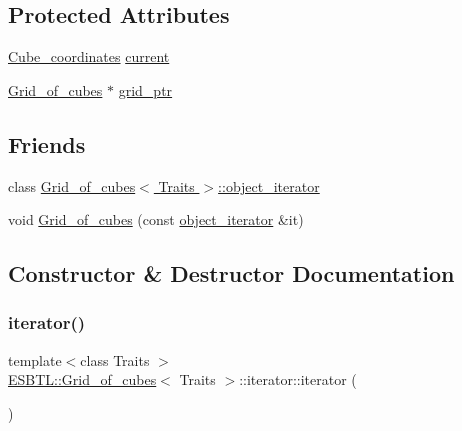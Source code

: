 \subsection*{Protected Attributes}
\begin{DoxyCompactItemize}
\item 
\hyperlink{structESBTL_1_1Grid__of__cubes_ad55c84346bab961e08d95e494551d07d}{Cube\+\_\+coordinates} \hyperlink{classESBTL_1_1Grid__of__cubes_1_1iterator_ab757f8b4d627babbf64ecc13a6de06f6}{current}
\item 
\hyperlink{structESBTL_1_1Grid__of__cubes}{Grid\+\_\+of\+\_\+cubes} $\ast$ \hyperlink{classESBTL_1_1Grid__of__cubes_1_1iterator_a492fb31fc0f9f1f7f61914a45bb7ed2e}{grid\+\_\+ptr}
\end{DoxyCompactItemize}
\subsection*{Friends}
\begin{DoxyCompactItemize}
\item 
class \hyperlink{classESBTL_1_1Grid__of__cubes_1_1iterator_a138d76a0aaa6fd7b0cbba3acb1474405}{Grid\+\_\+of\+\_\+cubes$<$ Traits $>$\+::object\+\_\+iterator}
\item 
void \hyperlink{classESBTL_1_1Grid__of__cubes_1_1iterator_a34522cc0511a0818c99ebcd4d1f010ec}{Grid\+\_\+of\+\_\+cubes} (const \hyperlink{classESBTL_1_1Grid__of__cubes_1_1object__iterator}{object\+\_\+iterator} \&it)
\end{DoxyCompactItemize}


\subsection{Constructor \& Destructor Documentation}
\mbox{\label{classESBTL_1_1Grid__of__cubes_1_1iterator_a5001cc15c0fa9403d6918232e4b1615e}} 
\subsubsection{\texorpdfstring{iterator()}{iterator()}\hspace{0.1cm}{\footnotesize\ttfamily [1/4]}}
{\footnotesize\ttfamily template$<$class Traits $>$ \\
\hyperlink{structESBTL_1_1Grid__of__cubes}{E\+S\+B\+T\+L\+::\+Grid\+\_\+of\+\_\+cubes}$<$ Traits $>$\+::iterator\+::iterator (\begin{DoxyParamCaption}{ }\end{DoxyParamCaption})\hspace{0.3cm}{\ttfamily [inline]}}

